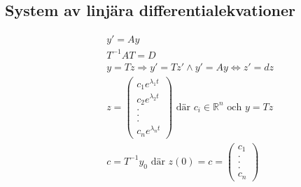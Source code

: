 \begin{multicols}{2}
\section{System av linjära differentialekvationer}
\begin{align*}
  &\quad  y'=Ay \\
  &\quad  T^{-1}AT=D \\
  &\quad  y=Tz \Rightarrow y'=Tz' \land y'=Ay \Leftrightarrow z'=dz \\
  &\quad  z=
  \begin{pmatrix} c_1e^{\lambda_1t} \\ c_2e^{\lambda_2t} \\.\\.\\.\\ c_n e^{\lambda_n t} \end{pmatrix}
  \text{ där } c_i\in\mathbb{R}^n  \text{ och } y=Tz \\
  &\quad  c = T^{-1}y_0 \text{ där } z(0) = c =
    \begin{pmatrix} c_1 \\.\\.\\.\\ c_n \end{pmatrix} 
\end{align*}


\end{multicols}
